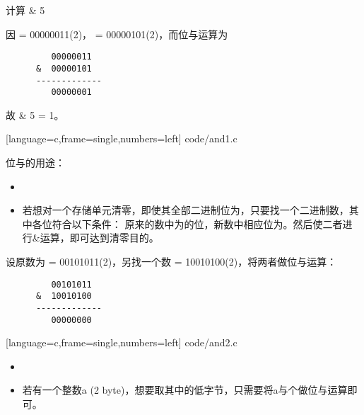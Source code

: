 \begin{frame}[fragile]
  \begin{li}
    计算{ \& 5}
  \end{li}
  \begin{jie}
    因{ = 00000011(2)}，{ = 00000101(2)}，而位与运算为
    \begin{lstlisting}
         00000011
      &  00000101
      -------------
         00000001
    \end{lstlisting}
    故{ \& 5 = 1}。
  \end{jie}
\end{frame}


\begin{frame}
  
  [language=c,frame=single,numbers=left]
  {code/and1.c}
\end{frame}


\begin{frame}
  位与的用途：

  \begin{itemize}
  \item {}
  \item[]  若想对一个存储单元清零，即使其全部二进制位为{}，只要找一个二进制数，其中各位符合以下条件： 原来的数中为{}的位，新数中相应位为{}。然后使二者进行{\tf \&}运算，即可达到清零目的。
  \end{itemize}
\end{frame}


\begin{frame}[fragile]
  \begin{li}
    设原数为{ = 00101011(2)}，另找一个数{ = {10010100(2)}}，将两者做位与运算：
    \begin{lstlisting}
         00101011
      &  10010100
      -------------
         00000000
    \end{lstlisting}
  \end{li}
\end{frame}

\begin{frame}
  
  [language=c,frame=single,numbers=left]
  {code/and2.c}
\end{frame}


\begin{frame}

  \begin{itemize}
  \item {}
  \item[]  若有一个整数{\tf a (2 byte)}，想要取其中的低字节，只需要将{\tf a}与{}个{}做位与运算即可。
  \end{itemize}
\end{frame}


